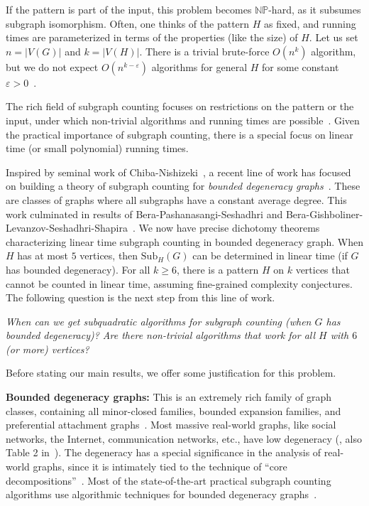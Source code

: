 \documentclass[a4paper,UKenglish,cleveref, autoref, numberwithinsect, thm-restate]{lipics-v2021}
\newcommand{\Sub}[2]{\mathrm{Sub}_{#2}(#1)}
\newcommand{\eps}{\varepsilon}
\begin{document}
	If the pattern is part of the input, this problem becomes $\mathbb{NP}$-hard,
	as it subsumes subgraph isomorphism. Often, one thinks of the pattern $H$ as fixed, and running times are parameterized in terms of the properties (like the size) of $H$.
	Let us set $n = |V(G)|$ and $k = |V(H)|$. 
	There is a trivial brute-force $O(n^k)$ algorithm, but we do not expect
	$O(n^{k-\eps})$ algorithms for general $H$ for some constant $\eps> 0$~\cite{DaJo04}. 
	
	The rich field of subgraph counting focuses on restrictions on the pattern or the input,
	under which non-trivial algorithms and running times are possible~\cite{ItRo78,AlYuZw97,BrWi99,DrGr00,DiSeTh02,DaJo04,BoChLo+06,CuDeMa17,Br19,RoWe20}. 
	Given the practical importance of subgraph counting, there is a special focus on linear time
	(or small polynomial) running times.
	
	Inspired by seminal work of Chiba-Nishizeki~\cite{ChNi85}, a recent line of work has focused
	on building a theory of subgraph counting for \emph{bounded degeneracy graphs}~\cite{Br19,BePaSe20,BePaSe21,BrRo22,BeGiLe+22}.
	These are classes of graphs where all subgraphs have a constant average degree. 
    This work culminated in results of Bera-Pashanasangi-Seshadhri and Bera-Gishboliner-Levanzov-Seshadhri-Shapira~\cite{BePaSe21, BeGiLe+22}.
	We now have precise dichotomy theorems characterizing linear time subgraph counting in bounded degeneracy graph.
    When $H$ has at most $5$ vertices, then $\Sub{G}{H}$ can
	be determined in linear time (if $G$ has bounded degeneracy). For all $k \geq 6$,
    there is a pattern $H$ on $k$ vertices that cannot be counted in linear time, assuming
    fine-grained complexity conjectures.
	The following question is the next step from this line of work.
	\smallskip
	
	\emph{When can we get subquadratic algorithms for subgraph counting (when $G$ has bounded degeneracy)?
		Are there non-trivial algorithms that work for all $H$ with $6$ (or more) vertices?
	}
	
	\smallskip
	Before stating our main results, we offer some justification for this problem.
	
	{\bf Bounded degeneracy graphs:} This is an extremely rich family of graph classes, containing
	all minor-closed families, bounded expansion families, and preferential attachment graphs~\cite{Se23}.
	Most massive real-world graphs, like social networks, the Internet, communication networks, etc.,
	have low degeneracy (\cite{GoGu06,JaSe17,ShElFa18,BeChGh20,BeSe20}, also Table 2 in~\cite{BeChGh20}). 
	The degeneracy has a special significance in the analysis of real-world graphs, since it is intimately tied to the technique of ``core decompositions''~\cite{Se23}. 
	Most of the state-of-the-art practical subgraph counting algorithms use algorithmic techniques
	for bounded degeneracy graphs~\cite{AhNeRo+15,JhSePi15,PiSeVi17,OrBr17,JaSe17,PaSe20}.
	
\end{document}

